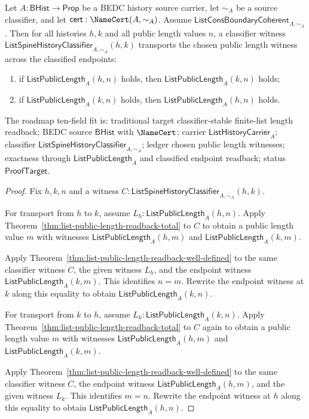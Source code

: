 \begin{theorem}
\label{thm:list-public-length-classifier-transport}
Let $A:\mathsf{BHist}\to\mathsf{Prop}$ be a BEDC history source carrier, let
$\sim_A$ be a source classifier, and let
$\mathsf{cert}:\NameCert(A,\sim_A)$. Assume
$\mathsf{ListConsBoundaryCoherent}_{A,\sim_A}$. Then for all histories $h,k$
and all public length values $n$, a classifier witness
$\mathsf{ListSpineHistoryClassifier}_{A,\sim_A}(h,k)$ transports the chosen
public length witness across the classified endpoints:
\begin{enumerate}
  \item if $\mathsf{ListPublicLength}_A(h,n)$ holds, then
  $\mathsf{ListPublicLength}_A(k,n)$ holds;
  \item if $\mathsf{ListPublicLength}_A(k,n)$ holds, then
  $\mathsf{ListPublicLength}_A(h,n)$ holds.
\end{enumerate}
The roadmap ten-field fit is: traditional target classifier-stable finite-list
length readback; BEDC source $\mathsf{BHist}$ with $\NameCert$; carrier
$\mathsf{ListHistoryCarrier}_A$; classifier
$\mathsf{ListSpineHistoryClassifier}_{A,\sim_A}$; ledger chosen public length
witnesses; exactness through $\mathsf{ListPublicLength}_A$ and classified
endpoint readback; status $\mathsf{ProofTarget}$.
\end{theorem}
\begin{proof}
Fix $h,k,n$ and a witness
$C:\mathsf{ListSpineHistoryClassifier}_{A,\sim_A}(h,k)$.

For transport from $h$ to $k$, assume
$L_h:\mathsf{ListPublicLength}_A(h,n)$. Apply
Theorem~\ref{thm:list-public-length-readback-total} to $C$ to obtain a public
length value $m$ with witnesses $\mathsf{ListPublicLength}_A(h,m)$ and
$\mathsf{ListPublicLength}_A(k,m)$.

Apply Theorem~\ref{thm:list-public-length-readback-well-defined} to the same
classifier witness $C$, the given witness $L_h$, and the endpoint witness
$\mathsf{ListPublicLength}_A(k,m)$. This identifies $n=m$. Rewrite the
endpoint witness at $k$ along this equality to obtain
$\mathsf{ListPublicLength}_A(k,n)$.

For transport from $k$ to $h$, assume
$L_k:\mathsf{ListPublicLength}_A(k,n)$. Apply
Theorem~\ref{thm:list-public-length-readback-total} to $C$ again to obtain a
public length value $m$ with witnesses
$\mathsf{ListPublicLength}_A(h,m)$ and $\mathsf{ListPublicLength}_A(k,m)$.

Apply Theorem~\ref{thm:list-public-length-readback-well-defined} to the same
classifier witness $C$, the endpoint witness $\mathsf{ListPublicLength}_A(h,m)$,
and the given witness $L_k$. This identifies $m=n$. Rewrite the endpoint
witness at $h$ along this equality to obtain
$\mathsf{ListPublicLength}_A(h,n)$.
\end{proof}

